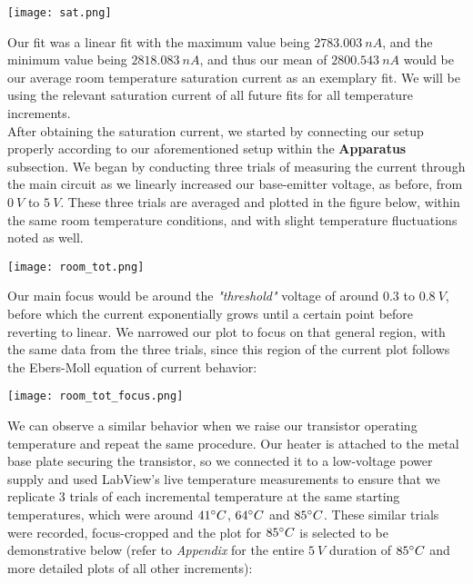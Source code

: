 \documentclass[10pt,letterpaper,onecolumn]{article}
\begin{document}
 \begin{center}
 \texttt{[image: sat.png]}
 \label{fig:sat}
 \end{center}

Our fit was a linear fit with the maximum value being $2783.003\ nA$, and the minimum value being $2818.083\ nA$, and thus our mean of $2800.543\ nA$ would be our average room temperature saturation current as an exemplary fit. We will be using the relevant saturation current of all future fits for all temperature increments. \\

After obtaining the saturation current, we started by connecting our setup properly according to our aforementioned setup within the {\bf Apparatus} subsection. We began by conducting three trials of measuring the current through the main circuit as we linearly increased our base-emitter voltage, as before, from $0\ V$ to $5\ V$. These three trials are averaged and plotted in the figure below, within the same room temperature conditions, and with slight temperature fluctuations noted as well.

 \begin{center}
 \texttt{[image: room\_tot.png]}
 \label{fig:room}
 \end{center}

Our main focus would be around the {\it "threshold"} voltage of around $0.3$ to $0.8\ V$, before which the current exponentially grows until a certain point before reverting to linear. We narrowed our plot to focus on that general region, with the same data from the three trials, since this region of the current plot follows the Ebers-Moll equation of current behavior:

 \begin{center}
 \texttt{[image: room\_tot\_focus.png]}
 \label{fig:room_focus}
 \end{center}

We can observe a similar behavior when we raise our transistor operating temperature and repeat the same procedure. Our heater is attached to the metal base plate securing the transistor, so we connected it to a low-voltage power supply and used LabView's live temperature measurements to ensure that we replicate 3 trials of each incremental temperature at the same starting temperatures, which were around $41\degree C$, $64\degree C$ and $85\degree C$. These similar trials were recorded, focus-cropped and the plot for $85\degree C$ is selected to be demonstrative below (refer to {\it Appendix} for the entire $5\ V$ duration of $85\degree C$ and more detailed plots of all other increments):
\end{document}
